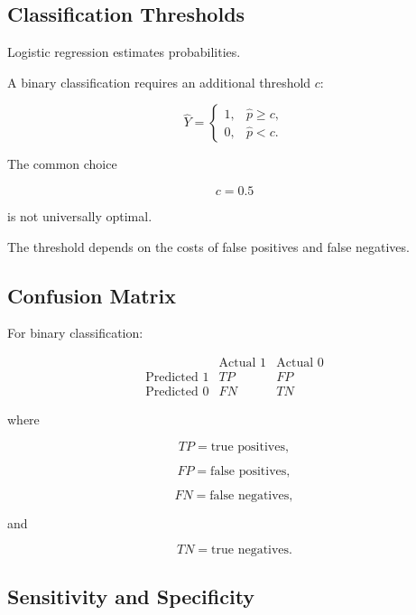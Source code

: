 \subsection{Classification Thresholds}
\label{subsec:classification-threshold}

Logistic regression estimates probabilities.

A binary classification requires an additional threshold \(c\):

\[
\widehat{Y}
=
\begin{cases}
1,&\widehat{p}\geq c,\\
0,&\widehat{p}<c.
\end{cases}
\]

The common choice

\[
c=0.5
\]

is not universally optimal.

The threshold depends on the costs of false positives and false
negatives.

\subsection{Confusion Matrix}
\label{subsec:confusion-matrix}

For binary classification:

\[
\begin{array}{c|cc}
&
\text{Actual }1
&
\text{Actual }0
\\
\hline
\text{Predicted }1
&
TP
&
FP
\\
\text{Predicted }0
&
FN
&
TN
\end{array}
\]

where

\[
TP
=
\text{true positives},
\]

\[
FP
=
\text{false positives},
\]

\[
FN
=
\text{false negatives},
\]

and

\[
TN
=
\text{true negatives}.
\]

\subsection{Sensitivity and Specificity}
\label{subsec:sensitivity-specificity}

